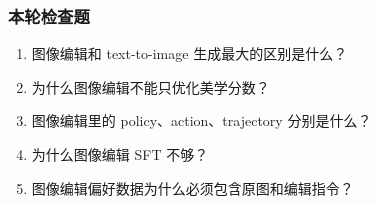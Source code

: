 \subsubsection{本轮检查题}

\begin{enumerate}[leftmargin=1.5em]
  \item 图像编辑和 text-to-image 生成最大的区别是什么？
  \item 为什么图像编辑不能只优化美学分数？
  \item 图像编辑里的 policy、action、trajectory 分别是什么？
  \item 为什么图像编辑 SFT 不够？
  \item 图像编辑偏好数据为什么必须包含原图和编辑指令？
\end{enumerate}
